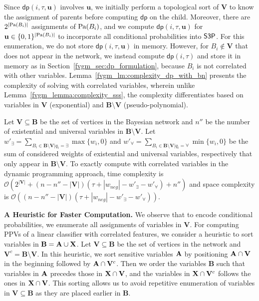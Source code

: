 Since $ \mathsf{dp}(i, \tau, \mathbf{u}) $ involves  $ \mathbf{u} $, we initially perform a topological sort of $ \mathbf{V} $ to know the assignment of parents before computing $ \mathsf{dp} $ on the child. Moreover, there are $ 2^{|\mathrm{Pa}(B_i)|} $ assignments of $ \mathrm{Pa}(B_i) $, and we compute $ \mathsf{dp}(i, \tau, \mathbf{u}) $ for $ \mathbf{u} \in \{0,1\}^{|\mathrm{Pa}(B_i)|} $ to incorporate all conditional probabilities into $ \mathsf{S3P} $.  For this enumeration, we do not store $ \mathsf{dp}(i, \tau, \mathbf{u}) $ in memory. However, for $ B_i \not \in \mathbf{V} $ that does not appear in the network, we instead compute $ \mathsf{dp}(i, \tau) $ and store it in memory as in Section~\ref{fvgm_sec:dp_formulation}, because $ B_i $ is not correlated with other variables.  Lemma~\ref{fvgm_lm:complexity_dp_with_bn} presents the complexity of solving {\stochastic} with correlated variables, wherein unlike Lemma~\ref{fvgm_lemma:complexity_sss}, the  complexity differentiates based on variables in $ \mathbf{V} $ (exponential) and $ \mathbf{B}\setminus \mathbf{V} $ (pseudo-polynomial). 


\begin{lemma}
	\label{fvgm_lm:complexity_dp_with_bn}
	Let $ \mathbf{V} \subseteq \mathbf{B} $ be the set of vertices in the Bayesian network and $ n'' $ be the number of existential and universal variables in $ \mathbf{B} \setminus \mathbf{V} $. Let $ w'_{\exists} = \sum_{B_i \in \mathbf{B} \setminus \mathbf{V} | q_i = \exists} \max\{w_i, 0\}$  and $ w'_{\forall} = \sum_{B_i \in \mathbf{B} \setminus \mathbf{V} | q_i = \forall} \min\{w_i, 0\}$ be the sum of considered weights of existential and universal variables, respectively that only appear in $ \mathbf{B} \setminus \mathbf{V} $. To exactly compute {\stochastic} with correlated variables in the dynamic programming approach,  time complexity is $ \mathcal{O}(2^{|\mathbf{V}|} + (n - n'' - |\mathbf{V}|)(\tau + |w_{neg}| - w'_{\exists} - w'_{\forall}) + n'') $ and space complexity is $ \mathcal{O}((n - n'' - |\mathbf{V}|)(\tau + |w_{neg}| - w'_{\exists} - w'_{\forall})) $.
\end{lemma}	

\textbf{A Heuristic for Faster Computation.} We observe that to encode conditional probabilities, we enumerate all assignments of variables in $ \mathbf{V} $. For computing PPVs of a linear classifier with correlated features, we consider a heuristic to sort variables in $ \mathbf{B} = \mathbf{A} \cup \mathbf{X} $. Let $ \mathbf{V} \subseteq \mathbf{B} $ be the set of vertices in the network and $ \mathbf{V}^c = \mathbf{B} \setminus \mathbf{V} $. In this heuristic, we sort sensitive variables $ \mathbf{A} $ by positioning $ \mathbf{A} \cap \mathbf{V} $ in the beginning followed by $ \mathbf{A} \cap \mathbf{V}^c $. Then we order the variables $ \mathbf{B} $ such that variables in $ \mathbf{A} $ precedes those in $ \mathbf{X} \cap \mathbf{V} $, and the variables in $ \mathbf{X} \cap \mathbf{V}^c $ follows the ones in $ \mathbf{X} \cap \mathbf{V} $. This sorting allows us to avoid repetitive enumeration of variables in $ \mathbf{V} \subseteq \mathbf{B} $ as they are placed earlier in $ \mathbf{B} $.

